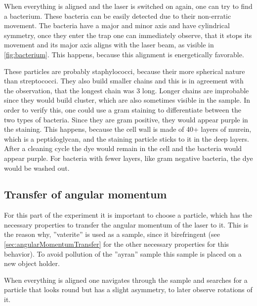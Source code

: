 \documentclass[12pt,english,ngerman]{scrartcl}
\begin{document}
When everything is aligned and the laser is switched on again, one can try to
find a bacterium. These bacteria can be easily detected due to their
non-erratic movement. The bacteria have a major and minor axis and have
cylindrical symmetry, once they enter the trap one can immediately observe,
that it stops its movement and its major axis aligns with the laser beam, as
visible in \autoref{fig:bacterium}. This happens, because this alignment is
energetically favorable.


These particles are probably staphylococci, because their more spherical nature
than streptococci. They also build smaller chains and this is in agreement with
the observation, that the longest chain was 3 long. Longer chains are
improbable since they would build cluster, which are also sometimes visible in
the sample.\cite{Bakterienformen} In order to verify this, one could use a gram
staining to differentiate between the two types of bacteria. Since they are
gram positive, they would appear purple in the staining. This happens, because
the cell wall is made of 40+ layers of murein, which is a peptidoglycan, and
the staining particle sticks to it in the deep layers. After a cleaning cycle
the dye would remain in the cell and the bacteria would appear purple. For
bacteria with fewer layers, like gram negative bacteria, the dye would be
washed out.\cite{ghazalMicrobiologicalHygenicDiscussion2024}

\subsection{Transfer of angular momentum}\label{sec:AuswertungAngularMomentum}

For this part of the experiment it is important to choose a particle, which has
the necessary properties to transfer the angular momentum of the laser to it.
This is the reason why, ''vaterite'' is used as a sample, since it birefringent
(see \autoref{sec:angularMomentumTransfer} for the other necessary properties
for this behavior). To avoid pollution of the ''ayran'' sample this sample is
placed on a new object holder.

When everything is aligned one navigates through the sample and searches for a
particle that looks round but has a slight asymmetry, to later observe
rotations of it.
\end{document}
